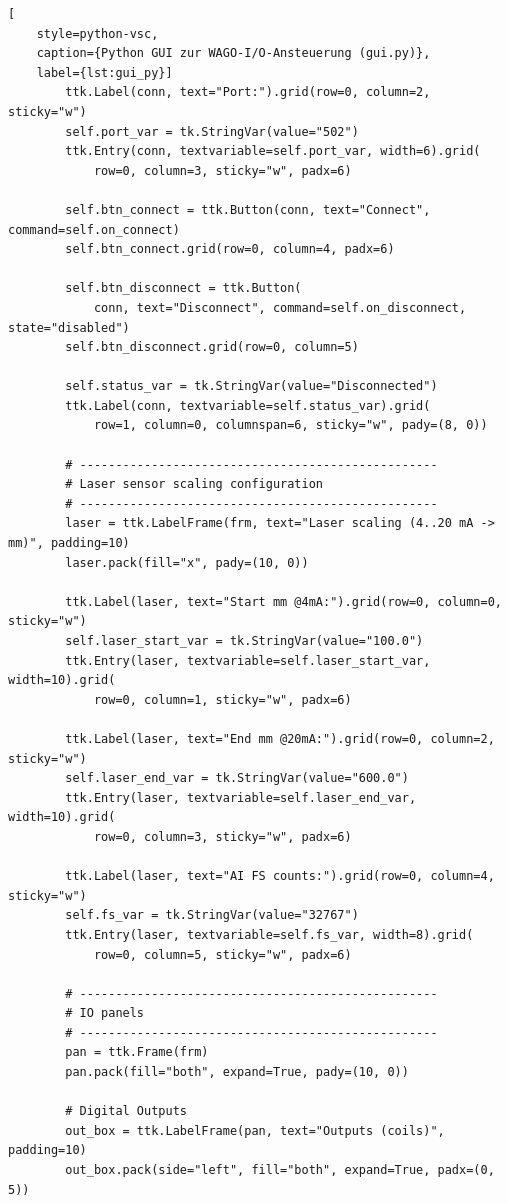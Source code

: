 \begin{lstlisting}[
    style=python-vsc,
    caption={Python GUI zur WAGO-I/O-Ansteuerung (gui.py)},
    label={lst:gui_py}]
        ttk.Label(conn, text="Port:").grid(row=0, column=2, sticky="w")
        self.port_var = tk.StringVar(value="502")
        ttk.Entry(conn, textvariable=self.port_var, width=6).grid(
            row=0, column=3, sticky="w", padx=6)

        self.btn_connect = ttk.Button(conn, text="Connect", command=self.on_connect)
        self.btn_connect.grid(row=0, column=4, padx=6)

        self.btn_disconnect = ttk.Button(
            conn, text="Disconnect", command=self.on_disconnect, state="disabled")
        self.btn_disconnect.grid(row=0, column=5)

        self.status_var = tk.StringVar(value="Disconnected")
        ttk.Label(conn, textvariable=self.status_var).grid(
            row=1, column=0, columnspan=6, sticky="w", pady=(8, 0))

        # --------------------------------------------------
        # Laser sensor scaling configuration
        # --------------------------------------------------
        laser = ttk.LabelFrame(frm, text="Laser scaling (4..20 mA -> mm)", padding=10)
        laser.pack(fill="x", pady=(10, 0))

        ttk.Label(laser, text="Start mm @4mA:").grid(row=0, column=0, sticky="w")
        self.laser_start_var = tk.StringVar(value="100.0")
        ttk.Entry(laser, textvariable=self.laser_start_var, width=10).grid(
            row=0, column=1, sticky="w", padx=6)

        ttk.Label(laser, text="End mm @20mA:").grid(row=0, column=2, sticky="w")
        self.laser_end_var = tk.StringVar(value="600.0")
        ttk.Entry(laser, textvariable=self.laser_end_var, width=10).grid(
            row=0, column=3, sticky="w", padx=6)

        ttk.Label(laser, text="AI FS counts:").grid(row=0, column=4, sticky="w")
        self.fs_var = tk.StringVar(value="32767")
        ttk.Entry(laser, textvariable=self.fs_var, width=8).grid(
            row=0, column=5, sticky="w", padx=6)

        # --------------------------------------------------
        # IO panels
        # --------------------------------------------------
        pan = ttk.Frame(frm)
        pan.pack(fill="both", expand=True, pady=(10, 0))

        # Digital Outputs
        out_box = ttk.LabelFrame(pan, text="Outputs (coils)", padding=10)
        out_box.pack(side="left", fill="both", expand=True, padx=(0, 5))


\end{lstlisting}
